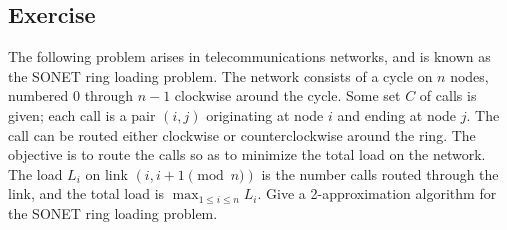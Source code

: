 \documentclass[14pt]{extreport}
\newcounter{counter}
\newcommand{\Exercise}{Exercise \stepcounter{counter}\thecounter}
\begin{document}
\subsection*{\Exercise}
    The following problem arises in telecommunications networks, and is known as the SONET ring loading problem. The network consists of a cycle on $n$ nodes, numbered $0$ through $n-1$ clockwise around the cycle. Some set $C$ of calls is given; each call is a pair $(i, j)$ originating at node $i$ and ending at node $j$. The call can be routed either clockwise or counterclockwise around the ring. The objective is to route the calls so as to minimize the total load on the network. The load $L_i$ on link $(i, i + 1 \pmod{n})$ is the number calls routed through the link, and the total load is $\max_{1\leq i\leq n} L_i$. Give a 2-approximation algorithm for the SONET ring loading problem.
\end{document}
